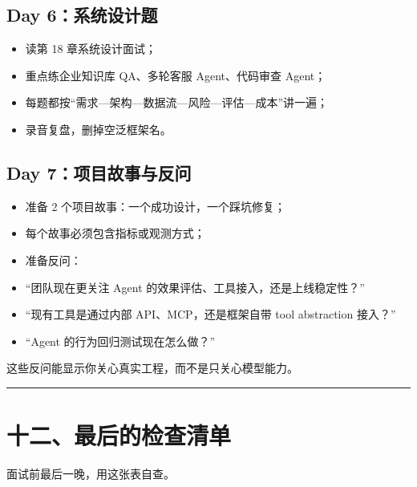 \subsection{Day 6：系统设计题}

\begin{itemize}[leftmargin=2em]
\item 读第 18 章系统设计面试；
\item 重点练企业知识库 QA、多轮客服 Agent、代码审查 Agent；
\item 每题都按``需求---架构---数据流---风险---评估---成本''讲一遍；
\item 录音复盘，删掉空泛框架名。
\end{itemize}

\subsection{Day 7：项目故事与反问}

\begin{itemize}[leftmargin=2em]
\item 准备 2 个项目故事：一个成功设计，一个踩坑修复；
\item 每个故事必须包含指标或观测方式；
\item 准备反问：
\item ``团队现在更关注 Agent 的效果评估、工具接入，还是上线稳定性？''
\item ``现有工具是通过内部 API、MCP，还是框架自带 tool abstraction 接入？''
\item ``Agent 的行为回归测试现在怎么做？''
\end{itemize}

这些反问能显示你关心真实工程，而不是只关心模型能力。


\bigskip\hrule\bigskip

\section{十二、最后的检查清单}

面试前最后一晚，用这张表自查。


